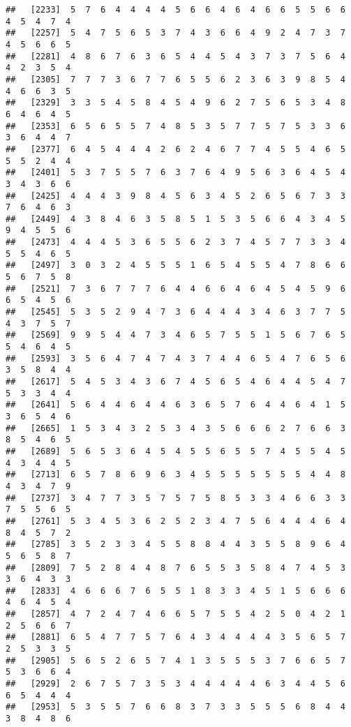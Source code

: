 \documentclass[
]{book}
\begin{document}
\begin{verbatim}
##   [2233]  5  7  6  4  4  4  4  5  6  6  4  6  4  6  6  5  5  6  6  4  5  4  7  4
##   [2257]  5  4  7  5  6  5  3  7  4  3  6  6  4  9  2  4  7  3  7  4  5  6  6  5
##   [2281]  4  8  6  7  6  3  6  5  4  4  5  4  3  7  3  7  5  6  4  4  2  3  5  4
##   [2305]  7  7  7  3  6  7  7  6  5  5  6  2  3  6  3  9  8  5  4  4  6  6  3  5
##   [2329]  3  3  5  4  5  8  4  5  4  9  6  2  7  5  6  5  3  4  8  6  4  6  4  5
##   [2353]  6  5  6  5  5  7  4  8  5  3  5  7  7  5  7  5  3  3  6  3  6  4  4  7
##   [2377]  6  4  5  4  4  4  2  6  2  4  6  7  7  4  5  5  4  6  5  5  5  2  4  4
##   [2401]  5  3  7  5  5  7  6  3  7  6  4  9  5  6  3  6  4  5  4  3  4  3  6  6
##   [2425]  4  4  4  3  9  8  4  5  6  3  4  5  2  6  5  6  7  3  3  7  6  4  6  3
##   [2449]  4  3  8  4  6  3  5  8  5  1  5  3  5  6  6  4  3  4  5  9  4  5  5  6
##   [2473]  4  4  4  5  3  6  5  5  6  2  3  7  4  5  7  7  3  3  4  5  5  4  6  5
##   [2497]  3  0  3  2  4  5  5  5  1  6  5  4  5  5  4  7  8  6  6  5  6  7  5  8
##   [2521]  7  3  6  7  7  7  6  4  4  6  6  4  6  4  5  4  5  9  6  6  5  4  5  6
##   [2545]  5  3  5  2  9  4  7  3  6  4  4  4  3  4  6  3  7  7  5  4  3  7  5  7
##   [2569]  9  9  5  4  4  7  3  4  6  5  7  5  5  1  5  6  7  6  5  5  4  6  4  5
##   [2593]  3  5  6  4  7  4  7  4  3  7  4  4  6  5  4  7  6  5  6  3  5  8  4  4
##   [2617]  5  4  5  3  4  3  6  7  4  5  6  5  4  6  4  4  5  4  7  5  3  3  4  4
##   [2641]  5  6  4  4  6  4  4  6  3  6  5  7  6  4  4  6  4  1  5  3  6  5  4  6
##   [2665]  1  5  3  4  3  2  5  3  4  3  5  6  6  6  2  7  6  6  3  8  5  4  6  5
##   [2689]  5  6  5  3  6  4  5  4  5  5  6  5  5  7  4  5  5  4  5  4  3  4  4  5
##   [2713]  6  5  7  8  6  9  6  3  4  5  5  5  5  5  5  5  4  4  8  4  3  4  7  9
##   [2737]  3  4  7  7  3  5  7  5  7  5  8  5  3  3  4  6  6  3  3  7  5  5  6  5
##   [2761]  5  3  4  5  3  6  2  5  2  3  4  7  5  6  4  4  4  6  4  8  4  5  7  2
##   [2785]  3  5  2  3  3  4  5  5  8  8  4  4  3  5  5  8  9  6  4  5  6  5  8  7
##   [2809]  7  5  2  8  4  4  8  7  6  5  5  3  5  8  4  7  4  5  3  3  6  4  3  3
##   [2833]  4  6  6  6  7  6  5  5  1  8  3  3  4  5  1  5  6  6  6  4  6  4  5  4
##   [2857]  4  7  2  4  7  4  6  6  5  7  5  5  4  2  5  0  4  2  1  2  5  6  6  7
##   [2881]  6  5  4  7  7  5  7  6  4  3  4  4  4  4  3  5  6  5  7  2  5  3  3  5
##   [2905]  5  6  5  2  6  5  7  4  1  3  5  5  5  3  7  6  6  5  7  5  3  6  6  4
##   [2929]  2  6  7  5  7  3  5  3  4  4  4  4  4  6  3  4  4  5  6  6  5  4  4  4
##   [2953]  5  3  5  5  7  6  6  8  3  7  3  3  5  5  5  6  8  4  4  3  8  4  8  6

\end{verbatim}
\end{document}
